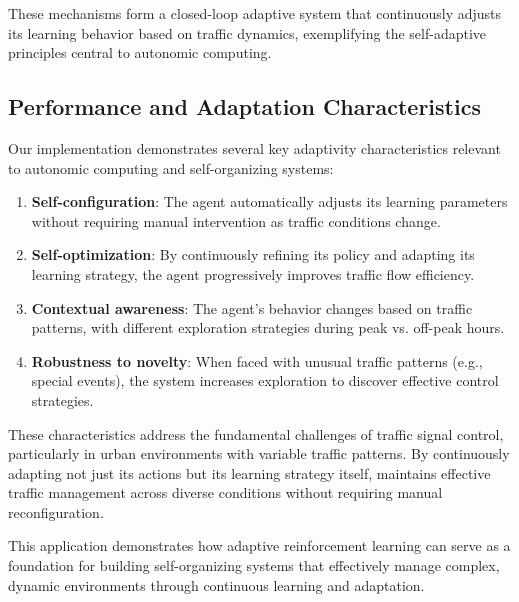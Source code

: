 These mechanisms form a closed-loop adaptive system that continuously adjusts its learning behavior based on traffic dynamics, exemplifying the self-adaptive principles central to autonomic computing.

\subsection{Performance and Adaptation Characteristics}

Our implementation demonstrates several key adaptivity characteristics relevant to autonomic computing and self-organizing systems:

\begin{enumerate}
    \item \textbf{Self-configuration}: The agent automatically adjusts its learning parameters without requiring manual intervention as traffic conditions change.
    
    \item \textbf{Self-optimization}: By continuously refining its policy and adapting its learning strategy, the agent progressively improves traffic flow efficiency.
    
    \item \textbf{Contextual awareness}: The agent's behavior changes based on traffic patterns, with different exploration strategies during peak vs. off-peak hours.
    
    \item \textbf{Robustness to novelty}: When faced with unusual traffic patterns (e.g., special events), the system increases exploration to discover effective control strategies.
\end{enumerate}

These characteristics address the fundamental challenges of traffic signal control, particularly in urban environments with variable traffic patterns. By continuously adapting not just its actions but its learning strategy itself, \adaptiverl maintains effective traffic management across diverse conditions without requiring manual reconfiguration.

This application demonstrates how adaptive reinforcement learning can serve as a foundation for building self-organizing systems that effectively manage complex, dynamic environments through continuous learning and adaptation.

\endinput

